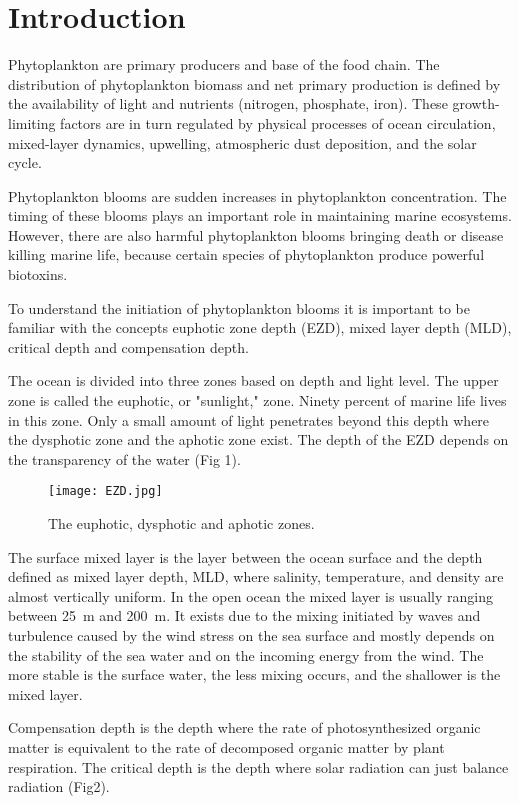 \documentclass[../Main.tex]{subfiles}
\begin{document}
\section*{\crule[blue]{.3cm}{.3cm} Introduction}
Phytoplankton are primary producers and base of the food chain.
The distribution of phytoplankton biomass and net primary production is defined by the availability of light and nutrients (nitrogen, phosphate, iron). 
These growth-limiting factors are in turn regulated by physical processes of ocean circulation, 
mixed-layer dynamics, upwelling, atmospheric dust deposition, and the solar cycle.\supercite{Behrenfeld}

Phytoplankton blooms are sudden increases in phytoplankton concentration. 
The timing of these blooms plays an important role in maintaining marine ecosystems. 
However, there are also harmful phytoplankton blooms bringing death or disease killing marine life, 
because certain species of phytoplankton produce powerful biotoxins.\supercite{Smayda97whatis}

To understand the initiation of phytoplankton blooms it is important to be familiar with the concepts euphotic zone depth (EZD), 
mixed layer depth (MLD), critical depth and compensation depth. 

The ocean is divided into three zones based on depth and light level. 
The upper zone is called the euphotic, or "sunlight," zone. Ninety percent of marine life lives in this zone. 
Only a small amount of light penetrates beyond this depth where the dysphotic zone and the aphotic zone exist. 
The depth of the EZD depends on the transparency of the water (Fig 1).\supercite{fig1}
\begin{figure}[H]
\texttt{[image: EZD.jpg]}
\caption{ The euphotic, dysphotic and aphotic zones.\supercite{fig1}}
\end{figure}
The surface mixed layer is the layer between the ocean surface and the depth defined as mixed layer depth, MLD, where salinity, temperature, and density are almost vertically uniform. 
In the open ocean the mixed layer is usually ranging between \SI{25}{m} and \SI{200}{m}. 
It exists due to the mixing initiated by waves and turbulence caused by the wind stress on the sea surface and mostly depends on the stability of the sea water and on the incoming energy from the wind. 
The more stable is the surface water, the less mixing occurs, and the shallower is the mixed layer.\supercite{JC00}

Compensation depth is the depth where the rate of photosynthesized organic matter is equivalent to the rate of decomposed organic matter by plant respiration. 
The critical depth is the depth where solar radiation can just balance radiation (Fig2).\supercite{Sverdrup1953OnCF} 
\end{document}
